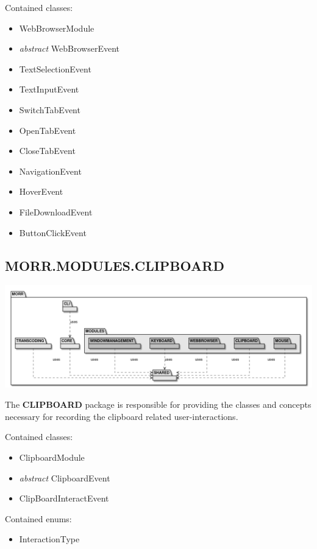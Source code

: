 Contained classes:
\begin{itemize}
\item WebBrowserModule
\item \textit{abstract} WebBrowserEvent
\item TextSelectionEvent
\item TextInputEvent
\item SwitchTabEvent
\item OpenTabEvent
\item CloseTabEvent
\item NavigationEvent
\item HoverEvent
\item FileDownloadEvent
\item ButtonClickEvent
\end{itemize}

\newpage
\subsection*{MORR.MODULES.CLIPBOARD}

\begin{center}
    \includegraphics[width=1.0\textwidth]{resources/Packages/AllPackages.png}
\end{center}

The \textbf{CLIPBOARD} package is responsible for providing the classes and concepts necessary for recording the clipboard related user-interactions.

Contained classes:
\begin{itemize}
\item ClipboardModule
\item \textit{abstract} ClipboardEvent
\item ClipBoardInteractEvent
\end{itemize}

Contained enums:
\begin{itemize}
\item InteractionType
\end{itemize}

